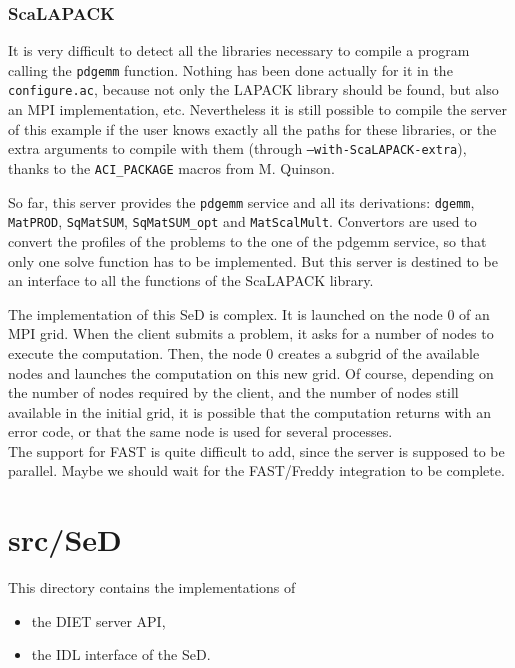 \subsubsection{ScaLAPACK}

It is very difficult to detect all the libraries necessary to compile a program
calling the \texttt{pdgemm} function. Nothing has been done actually for it in
the \texttt{configure.ac}, because not only the LAPACK library should be found,
but also an MPI implementation, etc. Nevertheless it is still possible to
compile the server of this example if the user knows exactly all the paths for
these libraries, or the extra arguments to compile with them (through
\texttt{--with-ScaLAPACK-extra}), thanks to the \texttt{ACI\_PACKAGE} macros
from M. Quinson.

So far, this server provides the \texttt{pdgemm} service and all its
derivations: \texttt{dgemm}, \texttt{MatPROD}, \texttt{SqMatSUM},
\texttt{SqMatSUM\_opt} and \texttt{MatScalMult}. Convertors are used to convert
the profiles of the problems to the one of the pdgemm service, so that only one
solve function has to be implemented. But this server is destined to be an
interface to all the functions of the ScaLAPACK library.

The implementation of this SeD is complex. It is launched on the node 0 of an
MPI grid. When the client submits a problem, it asks for a number of nodes to
execute the computation. Then, the node 0 creates a subgrid of the available
nodes and launches the computation on this new grid. Of course, depending on the
number of nodes required by the client, and the number of nodes still available
in the initial grid, it is possible that the computation returns with an error
code, or that the same node is used for several processes.
\\

The support for FAST is quite difficult to add, since the server is supposed to
be parallel. Maybe we should wait for the FAST/Freddy integration to be
complete.



\section{\textsf{src/SeD}}
\label{s:SeD}

This directory contains the implementations of
\begin{itemize}
\item the DIET server API,
\item the IDL interface of the SeD.
\end{itemize}
\

